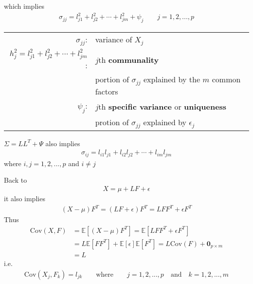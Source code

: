 \documentclass[12pt]{extarticle}
\newcommand{\<}{\langle}
\renewcommand{\>}{\rangle}
\theoremstyle{definition}
\begin{document}
which implies
\begin{align*}
    \sigma_{jj}=l^2_{j1} +l^2_{j2} +\cdots +l^2_{jm} +\psi_j \qquad j=1,2,...,p
\end{align*}

\begin{tabular}{rl}
    $\sigma_{jj}$:& variance of $X_j$\\
    $h^2_j=l^2_{j1}+l^2_{j2}+\cdots+l^2_{jm}$:& $j$th \textbf{communality}\\
    & portion of $\sigma_{jj}$ explained by the $m$ common factors \\
    $\psi_j$:& $j$th \textbf{specific variance} or \textbf{uniqueness}\\
    & protion of $\sigma_{jj}$ explained by $\epsilon_j$
\end{tabular}
$\Sigma=LL^T + \Psi$ also implies
\begin{align*}
    \sigma_{ij}=l_{i1}l_{j1} + l_{i2}l_{j2} + \cdots + l_{im}l_{jm}
\end{align*}
where $i,j=1,2,...,p$ and $i \neq j$

Back to
\begin{align*}
    X=\mu +LF+\epsilon
\end{align*}
it also implies
\begin{align*}
    (X-\mu)F^T = (LF+\epsilon)F^T = LFF^T + \epsilon F^T
\end{align*}
Thus
\begin{align*}
    \text{Cov}(X,F) &= \mathbb{E}[(X-\mu)F^T] = \mathbb{E}[LFF^T + \epsilon F^T]\\
    &= L\mathbb{E}[FF^T] +\mathbb{E}[\epsilon]\mathbb{E}[F^T] = L\text{Cov}(F) + \textbf{0}_{p\times m}\\
    &= L
\end{align*}
i.e.
\begin{align*}
    \text{Cov}(X_j, F_k)=l_{jk} \qquad \text{where} \qquad j=1,2,...,p \quad \text{and} \quad k=1,2,...,m
\end{align*}
\end{document}
